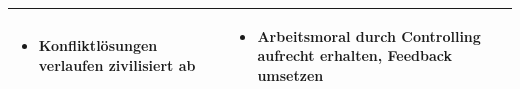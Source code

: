 \begin{center}
\begin{scriptsize}
\begin{tabularx}{\textwidth}{|p{8cm}|X|}
\begin{minipage}{.56\textwidth}
\begin{flushleft}
\begin{itemize}
         \item Konfliktlösungen verlaufen zivilisiert ab
         \vspace{0.2cm}
    \end{itemize}
    \end{flushleft}
    \end{minipage} &
    \begin{minipage}{.4\textwidth} 
    \begin{flushleft}
        \begin{itemize} \vspace{0cm}  
         \item Arbeitsmoral durch Controlling aufrecht erhalten, Feedback umsetzen
         \vspace{0.2cm}
    \end{itemize}
    \end{flushleft}
    \end{minipage} \\
    \hline
\end{tabularx}
\end{scriptsize}
\end{center}
\endgroup

\newpage

